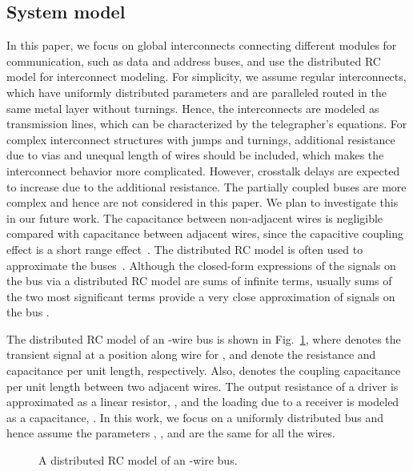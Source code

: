 \documentclass[10pt,journal]{IEEEtran}
\begin{document}
\subsection{System model}

In this paper, we focus on global interconnects connecting different modules for communication, such as data and address buses, and use the distributed RC model for interconnect modeling. For simplicity, we assume regular interconnects, which have uniformly distributed parameters and are paralleled routed in the same metal layer without turnings. Hence, the interconnects are modeled as transmission lines, which can be characterized by the telegrapher's equations.
For complex interconnect structures with jumps and turnings, additional resistance due to vias and unequal length of wires should be included, which makes the interconnect behavior more complicated. However, crosstalk delays are expected to increase due to the additional resistance.
The partially coupled buses are more complex and hence are not considered in this paper. We plan to investigate this in our future work.
The capacitance between non-adjacent wires is negligible compared with capacitance between adjacent wires, since the capacitive coupling effect is a short range effect~\cite{SC_TVLSI02}.
The distributed RC model is often used to approximate the buses~\cite{Rab96}. Although the closed-form expressions of the signals on the bus via a distributed RC model are sums of infinite terms, usually sums of the two most significant terms provide a very close approximation of signals on the bus \cite{Sak93}.


The distributed RC model of an -wire bus is shown in Fig.~\ref{fig:3bus}, where  denotes the transient signal at a position  along wire  for ,  and  denote the resistance and capacitance per unit length, respectively. Also,  denotes the coupling capacitance per unit length between two adjacent wires. The output resistance of a driver is approximated as a linear resistor, , and the loading due to a receiver is modeled as a capacitance, . In this work, we focus on a uniformly distributed bus and hence assume the parameters , , and  are the same for all the wires.

\begin{figure}[!tb]
\begin{minipage}[b]{1.0\linewidth}
  \centering
 \centerline{}
\end{minipage}
\caption{A distributed RC model of an -wire bus.}
\label{fig:3bus}
\end{figure}
\end{document}

